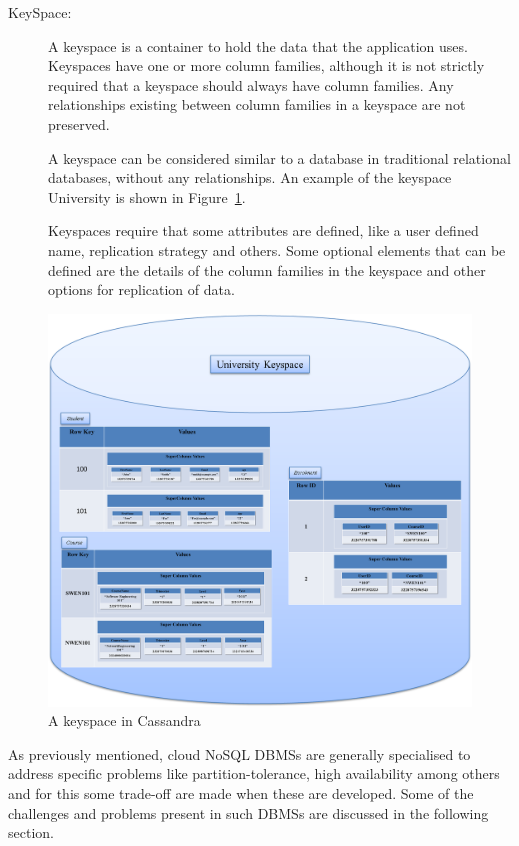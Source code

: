 \begin{description}
\item [KeySpace:] A keyspace is a container to hold the data that the
application uses.  Keyspaces have one or more column families,   although it is not strictly
required that a keyspace should always have column families.  Any relationships
existing between column families in a keyspace are not preserved. 

A keyspace can be considered similar to a database in traditional relational
databases,   without any relationships.  An example of the keyspace
University is shown in Figure~\ref{f:keyspace}. 

Keyspaces require that some attributes are defined,   like a user defined name,  
replication strategy and others.  Some optional elements that can be defined are
the details of the column families in the keyspace and other options
for replication of data. 
\end{description}


\begin{figure}[H]
	\centering
	\includegraphics[width=.9\textwidth]{./figure/Example/KEYSPACE.png}
	\caption{A keyspace in
	Cassandra}\label{f:keyspace}
\end{figure}

As previously mentioned,  cloud \ac{NoSQL}
\acp{DBMS} are generally specialised to address specific problems like
partition-tolerance,  high availability among others and for this some
trade-off are made when these are developed.
Some of the challenges and problems present in such \acp{DBMS} are discussed in the following section.

